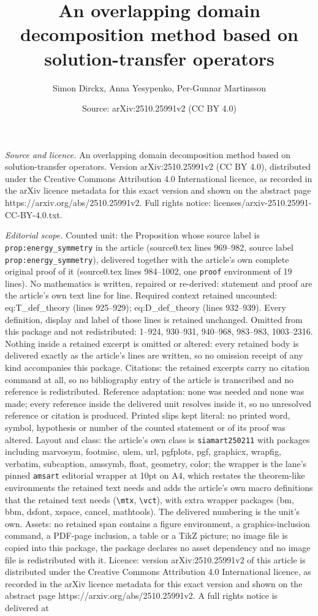 \documentclass[10pt,a4paper]{amsart}
\title[An overlapping domain decomposition method based on solution]{An overlapping domain decomposition method based on solution-transfer operators}
\author{Simon Dirckx, Anna Yesypenko, Per-Gunnar Martinsson}
\date{Source: arXiv:2510.25991v2 (CC BY 4.0)}
\begin{document}
\maketitle

\noindent\emph{Source and licence.} An overlapping domain decomposition method based on solution-transfer operators. Version arXiv:2510.25991v2 (CC BY 4.0), distributed under the Creative Commons Attribution 4.0 International licence, as recorded in the arXiv licence metadata for this exact version and shown on the abstract page https://arxiv.org/abs/2510.25991v2. Full rights notice: licenses/arxiv-2510.25991-CC-BY-4.0.txt.\par\smallskip

\noindent\textit{Editorial scope.} Counted unit: the Proposition whose source label is \texttt{prop:energy\_symmetry} in the article (source0.tex lines 969--982, source label \texttt{prop:energy\_symmetry}), delivered together with the article's own complete original proof of it (source0.tex lines 984--1002, one \texttt{proof} environment of 19 lines). No mathematics is written, repaired or re-derived: statement and proof are the article's own text line for line. Required context retained uncounted: eq:T\_def\_theory (lines 925--929); eq:D\_def\_theory (lines 932--939). Every definition, display and label of those lines is retained unchanged. Omitted from this package and not redistributed: 1--924, 930--931, 940--968, 983--983, 1003--2316. Nothing inside a retained excerpt is omitted or altered: every retained body is delivered exactly as the article's lines are written, so no omission receipt of any kind accompanies this package. Citations: the retained excerpts carry no citation command at all, so no bibliography entry of the article is transcribed and no reference is redistributed. Reference adaptation: none was needed and none was made; every reference inside the delivered unit resolves inside it, so no unresolved reference or citation is produced. Printed slips kept literal: no printed word, symbol, hypothesis or number of the counted statement or of its proof was altered. Layout and class: the article's own class is \texttt{siamart250211} with packages including marvosym, footmisc, ulem, url, pgfplots, pgf, graphicx, wrapfig, verbatim, subcaption, amssymb, float, geometry, color; the wrapper is the lane's pinned \texttt{amsart} editorial wrapper at 10pt on A4, which restates the theorem-like environments the retained text needs and adds the article's own macro definitions that the retained text needs (\texttt{\textbackslash mtx}, \texttt{\textbackslash vct}), with extra wrapper packages (bm, bbm, dsfont, xspace, cancel, mathtools). The delivered numbering is the unit's own. Assets: no retained span contains a figure environment, a graphics-inclusion command, a PDF-page inclusion, a table or a TikZ picture; no image file is copied into this package, the package declares no asset dependency and no image file is redistributed with it. Licence: version arXiv:2510.25991v2 of this article is distributed under the Creative Commons Attribution 4.0 International licence, as recorded in the arXiv licence metadata for this exact version and shown on the abstract page https://arxiv.org/abs/2510.25991v2. A full rights notice is delivered at 
\end{document}
